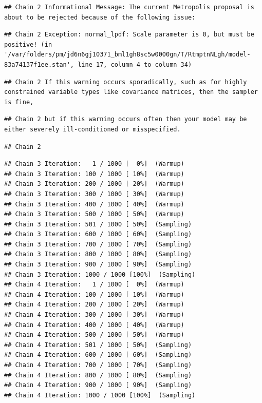 \documentclass[
]{book}
\begin{document}
\begin{verbatim}
## Chain 2 Informational Message: The current Metropolis proposal is about to be rejected because of the following issue:
\end{verbatim}

\begin{verbatim}
## Chain 2 Exception: normal_lpdf: Scale parameter is 0, but must be positive! (in '/var/folders/pm/jd6n6gj10371_bml1gh8sc5w0000gn/T/RtmptnNLgh/model-83a74137f1ee.stan', line 17, column 4 to column 34)
\end{verbatim}

\begin{verbatim}
## Chain 2 If this warning occurs sporadically, such as for highly constrained variable types like covariance matrices, then the sampler is fine,
\end{verbatim}

\begin{verbatim}
## Chain 2 but if this warning occurs often then your model may be either severely ill-conditioned or misspecified.
\end{verbatim}

\begin{verbatim}
## Chain 2
\end{verbatim}

\begin{verbatim}
## Chain 3 Iteration:   1 / 1000 [  0%]  (Warmup) 
## Chain 3 Iteration: 100 / 1000 [ 10%]  (Warmup) 
## Chain 3 Iteration: 200 / 1000 [ 20%]  (Warmup) 
## Chain 3 Iteration: 300 / 1000 [ 30%]  (Warmup) 
## Chain 3 Iteration: 400 / 1000 [ 40%]  (Warmup) 
## Chain 3 Iteration: 500 / 1000 [ 50%]  (Warmup) 
## Chain 3 Iteration: 501 / 1000 [ 50%]  (Sampling) 
## Chain 3 Iteration: 600 / 1000 [ 60%]  (Sampling) 
## Chain 3 Iteration: 700 / 1000 [ 70%]  (Sampling) 
## Chain 3 Iteration: 800 / 1000 [ 80%]  (Sampling) 
## Chain 3 Iteration: 900 / 1000 [ 90%]  (Sampling) 
## Chain 3 Iteration: 1000 / 1000 [100%]  (Sampling) 
## Chain 4 Iteration:   1 / 1000 [  0%]  (Warmup) 
## Chain 4 Iteration: 100 / 1000 [ 10%]  (Warmup) 
## Chain 4 Iteration: 200 / 1000 [ 20%]  (Warmup) 
## Chain 4 Iteration: 300 / 1000 [ 30%]  (Warmup) 
## Chain 4 Iteration: 400 / 1000 [ 40%]  (Warmup) 
## Chain 4 Iteration: 500 / 1000 [ 50%]  (Warmup) 
## Chain 4 Iteration: 501 / 1000 [ 50%]  (Sampling) 
## Chain 4 Iteration: 600 / 1000 [ 60%]  (Sampling) 
## Chain 4 Iteration: 700 / 1000 [ 70%]  (Sampling) 
## Chain 4 Iteration: 800 / 1000 [ 80%]  (Sampling) 
## Chain 4 Iteration: 900 / 1000 [ 90%]  (Sampling) 
## Chain 4 Iteration: 1000 / 1000 [100%]  (Sampling)
\end{verbatim}
\end{document}
